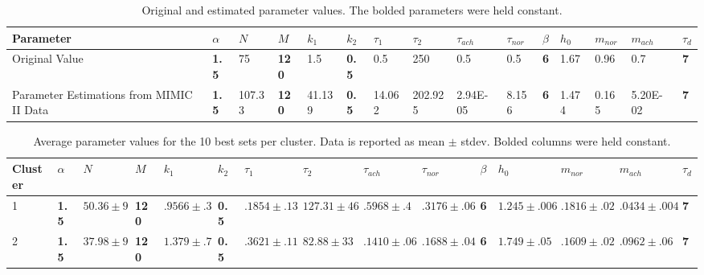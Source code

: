 \documentclass[fleqn,10pt]{wlscirep}
\begin{document}
\begin{table}[ht]
\centering
\scriptsize
\caption{Original and estimated parameter values. The bolded parameters were held constant.}
\label{tab:SingleParamsNLopt}
\begin{tabular}{|l|l|l|l|l|l|l|l|l|l|l|l|l|l|l|}
\hline
Parameter                                 & \textbf{$\alpha$} & $N$    & \textbf{$M$} & $k_1$  & \textbf{$k_2$} & $\tau_1$ & $\tau_2$ & $\tau_{ach}$ & $\tau_{nor}$ & \textbf{$\beta$} & $h_0$ & $m_{nor}$ & $m_{ach}$ & \textbf{$\tau_d$} \\ \hline
Original Value                            & \textbf{1.5}      & 75     & \textbf{120} & 1.5    & \textbf{0.5}   & 0.5      & 250      & 0.5          & 0.5          & \textbf{6}       & 1.67  & 0.96      & 0.7       & \textbf{7}        \\ \hline
Parameter Estimations from MIMIC II  Data & \textbf{1.5}      & 107.33 & \textbf{120} & 41.139 & \textbf{0.5}   & 14.062   & 202.925  & 2.94E-05     & 8.156        & \textbf{6}       & 1.474 & 0.165     & 5.20E-02  & \textbf{7}        \\ \hline
\end{tabular}
\end{table}

\begin{table}[]
\centering
\scriptsize
\caption{Average parameter values for the 10 best sets per cluster. Data is reported as mean $\pm$ stdev. Bolded columns were held constant.}
\label{tab:MultiobjectiveParams}
\begin{tabular}{|l|l|l|l|l|l|l|l|l|l|l|l|l|l|l|}
\hline
Cluster & \textbf{$\alpha$} & $N$          & \textbf{$M$} & $k_1$          & \textbf{$k_2$} & $\tau_1$       & $\tau_2$        & $\tau_{ach}$   & $\tau_{nor}$   & \textbf{$\beta$} & $h_0$           & $m_{nor}$      & $m_{ach}$       & \textbf{$\tau_d$} \\ \hline
1       & \textbf{1.5}      & $50.36\pm 9$ & \textbf{120} & $.9566 \pm .3$ & \textbf{0.5}   & $.1854\pm .13$ & $127.31 \pm 46$ & $.5968 \pm .4$ & $.3176\pm .06$ & \textbf{6}       & $1.245\pm .006$ & $.1816\pm .02$ & $.0434\pm .004$ & \textbf{7}        \\ \hline
2       & \textbf{1.5}      & $37.98\pm 9$ & \textbf{120} & $1.379\pm .7$  & \textbf{0.5}   & $.3621\pm .11$ & $82.88\pm 33$   & $.1410\pm .06$ & $.1688\pm.04$  & \textbf{6}       & $1.749\pm.05$   & $.1609\pm.02$  & $.0962\pm .06$  & \textbf{7}        \\ \hline
\end{tabular}
\end{table}
\end{document}
